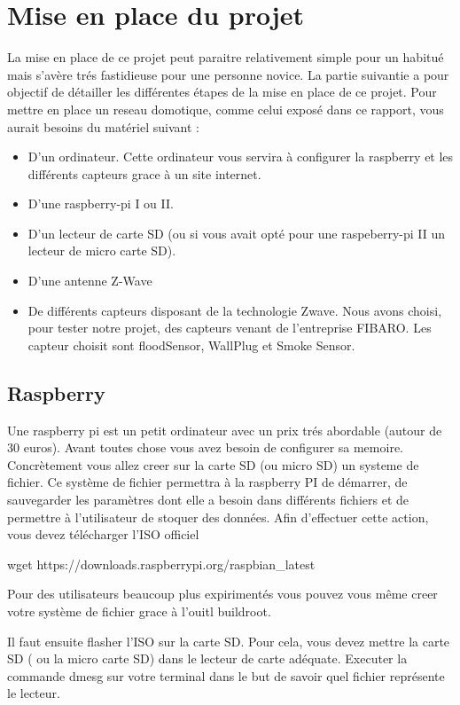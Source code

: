 \chapter{Mise en place du projet}
La mise en place de ce projet peut paraitre relativement simple pour un habitué mais s'avère trés fastidieuse pour une personne novice.
La partie suivantie a pour objectif de détailler les différentes étapes de la mise en place de ce projet.
Pour mettre en place un reseau domotique, comme celui exposé dans ce rapport, vous aurait besoins du matériel suivant :

\begin{itemize}
	\item D'un  ordinateur. Cette ordinateur vous servira à configurer la raspberry et  les différents capteurs grace à un site internet.
	\item D'une raspberry-pi I ou II. 
	\item D'un lecteur de carte SD (ou si vous avait opté pour une raspeberry-pi II un lecteur de micro carte SD).
	\item D'une antenne Z-Wave
	\item De différents capteurs disposant de la technologie Zwave. Nous avons choisi, pour tester notre projet, des capteurs venant de l'entreprise FIBARO. Les capteur choisit sont floodSensor, WallPlug et Smoke Sensor.
\end{itemize}

\section{Raspberry}
Une raspberry pi est un petit ordinateur avec un prix trés abordable (autour de 30 euros).
Avant toutes chose vous avez besoin de configurer sa memoire. Concrètement vous allez creer sur la carte SD (ou micro SD) un systeme de fichier.
Ce système de fichier permettra à la raspberry PI de démarrer, de sauvegarder les paramètres dont elle a besoin dans différents fichiers et de permettre à l'utilisateur de stoquer des données.
Afin d'effectuer cette action, vous devez télécharger l'ISO officiel 

wget https://downloads.raspberrypi.org/raspbian\_latest

Pour des utilisateurs beaucoup plus expirimentés vous pouvez vous même creer votre système de fichier grace à l'ouitl buildroot.

Il faut ensuite flasher l'ISO sur la carte SD. Pour cela, vous devez mettre la carte SD ( ou la micro carte SD) dans le lecteur de carte adéquate. 
Executer la commande dmesg sur votre terminal dans le but de savoir quel fichier représente le lecteur.

